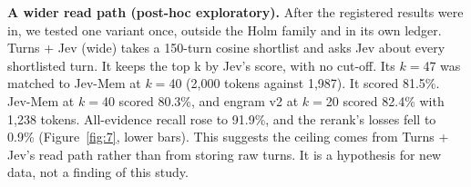 \documentclass[11pt]{article}
\newcommand{\src}[1]{}
\begin{document}
\textbf{A wider read path (post-hoc exploratory).} After the registered results were in, we tested one variant once, outside the Holm family and in its own ledger. Turns + Jev (wide) takes a 150\src{bench/run.py\#ARMS/lean\_t0r\_wide/flags/retrieval\_shortlist}-turn cosine shortlist and asks Jev about every shortlisted turn. It keeps the top k by Jev's score, with no cut-off. Its $k{=}$47\src{bench/results/v3\_posthoc/report.json\#t0r\_wide\_k} was matched to Jev-Mem at $k{=}$40 (2,000\src{bench/results/v3\_posthoc/report.json\#comparison/T0R-wide 47 (POST-HOC EXPLORATORY (T0R-wide; docs/V3\_PLAN.md §12))/tokens\_mean} tokens against 1,987\src{bench/results/v3\_posthoc/token\_match.json\#comparator\_mean\_tokens}). It scored 81.5\%\src{bench/results/v3\_posthoc/report.json\#comparison/T0R-wide 47 (POST-HOC EXPLORATORY (T0R-wide; docs/V3\_PLAN.md §12))/accuracy}. Jev-Mem at $k{=}$40 scored 80.3\%\src{bench/results/v3/batch\_a\_report.json\#fresh/Jev-Mem k40/accuracy}, and engram v2 at $k{=}$20 scored 82.4\%\src{bench/results/v3/batch\_b\_report.json\#fresh/engram v2 k20/accuracy} with 1,238\src{bench/results/v3/batch\_b\_report.json\#fresh/engram v2 k20/tokens\_mean} tokens. All-evidence recall rose to 91.9\%\src{bench/results/v3\_posthoc/report.json\#shortlist\_recall/all/shortlist\_recall\_all}, and the rerank's losses fell to 0.9\%\src{bench/results/v3\_posthoc/report.json\#shortlist\_recall/all/top\_k\_drops\_all\_shortlisted\_evidence} (Figure~\ref{fig:7}, lower bars). This suggests the ceiling comes from Turns + Jev's read path rather than from storing raw turns. It is a hypothesis for new data, not a finding of this study.
\end{document}
